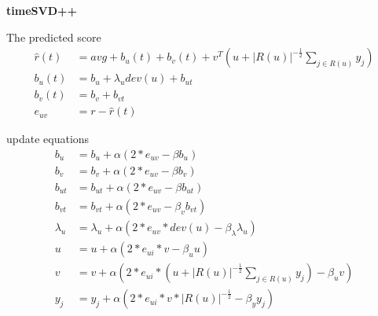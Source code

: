\documentclass[11pt]{article}
\begin{document}
\textbf{timeSVD++}

The predicted score 
\begin{align*}
    \hat{r}(t) &= avg+b_u(t)+b_v(t)+v^T(u+|R(u)|^{-\frac{1}{2}}\sum_{j\in R(u)}y_j)\\
    b_u(t) &= b_u+\lambda_u dev(u)+b_{ut} \\
    b_v(t) &= b_v+b_{vt} \\
    e_{uv} &= r-\hat{r}(t)
\end{align*}

update equations
\begin{align*}
b_u &= b_u+\alpha(2*e_{uv}-\beta b_u) \\
b_v &= b_v+\alpha(2*e_{uv}-\beta b_v) \\
b_{ut} &= b_{ut}+\alpha(2*e_{uv}-\beta b_{ut})\\
b_{vt} &= b_{vt}+\alpha(2*e_{uv}-\beta_v b_{vt})\\
\lambda_{u} &= \lambda_{u}+\alpha(2*e_{uv}*dev(u)-\beta_{\lambda}\lambda_{u}) \\
u &= u+\alpha(2*e_{ui}*v-\beta_u u) \\
v &= v+\alpha(2*e_{ui}*(u+|R(u)|^{-\frac{1}{2}}\sum_{j\in R(u)}y_j)-\beta_u v)\\
y_j &= y_j+\alpha(2*e_{ui}*v*|R(u)|^{-\frac{1}{2}}-\beta_y y_j)
\end{align*}
\end{document}
